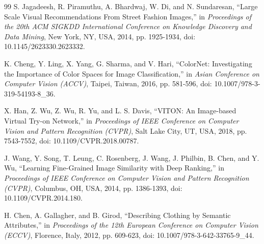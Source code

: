 \documentclass[12pt,a4paper]{report}
\begin{document}
\begin{thebibliography}{99}
S. Jagadeesh, R. Piramuthu, A. Bhardwaj, W. Di, and N. Sundaresan, ``Large Scale Visual Recommendations From Street Fashion Images,'' in \textit{Proceedings of the 20th ACM SIGKDD International Conference on Knowledge Discovery and Data Mining}, New York, NY, USA, 2014, pp. 1925-1934, doi: 10.1145/2623330.2623332.

K. Cheng, Y. Ling, X. Yang, G. Sharma, and V. Hari, ``ColorNet: Investigating the Importance of Color Spaces for Image Classification,'' in \textit{Asian Conference on Computer Vision (ACCV)}, Taipei, Taiwan, 2016, pp. 581-596, doi: 10.1007/978-3-319-54193-8\_36.

X. Han, Z. Wu, Z. Wu, R. Yu, and L. S. Davis, ``VITON: An Image-based Virtual Try-on Network,'' in \textit{Proceedings of IEEE Conference on Computer Vision and Pattern Recognition (CVPR)}, Salt Lake City, UT, USA, 2018, pp. 7543-7552, doi: 10.1109/CVPR.2018.00787.

J. Wang, Y. Song, T. Leung, C. Rosenberg, J. Wang, J. Philbin, B. Chen, and Y. Wu, ``Learning Fine-Grained Image Similarity with Deep Ranking,'' in \textit{Proceedings of IEEE Conference on Computer Vision and Pattern Recognition (CVPR)}, Columbus, OH, USA, 2014, pp. 1386-1393, doi: 10.1109/CVPR.2014.180.

H. Chen, A. Gallagher, and B. Girod, ``Describing Clothing by Semantic Attributes,'' in \textit{Proceedings of the 12th European Conference on Computer Vision (ECCV)}, Florence, Italy, 2012, pp. 609-623, doi: 10.1007/978-3-642-33765-9\_44.

\end{thebibliography}
\end{document}
